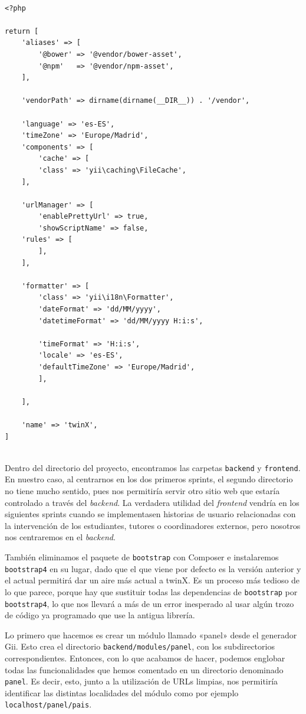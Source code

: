 \begin{verbatim}
	
<?php

return [
	'aliases' => [
		'@bower' => '@vendor/bower-asset',
		'@npm'   => '@vendor/npm-asset',
	],
	
	'vendorPath' => dirname(dirname(__DIR__)) . '/vendor',
	
	'language' => 'es-ES',
	'timeZone' => 'Europe/Madrid',
	'components' => [
		'cache' => [
		'class' => 'yii\caching\FileCache',
	],
	
	'urlManager' => [
		'enablePrettyUrl' => true,
		'showScriptName' => false,
	'rules' => [
		],
	],
	
	'formatter' => [
		'class' => 'yii\i18n\Formatter',
		'dateFormat' => 'dd/MM/yyyy',
		'datetimeFormat' => 'dd/MM/yyyy H:i:s',
		
		'timeFormat' => 'H:i:s',
		'locale' => 'es-ES',
		'defaultTimeZone' => 'Europe/Madrid',
		],
	
	],
	
	'name' => 'twinX',
]
	
\end{verbatim}

Dentro del directorio del proyecto, encontramos las carpetas \texttt{backend} y \texttt{frontend}. En nuestro caso, al centrarnos en los dos primeros sprints, el segundo directorio no tiene mucho sentido, pues nos permitiría servir otro sitio web que estaría controlado a través del \textit{backend}. La verdadera utilidad del \textit{frontend} vendría en los siguientes sprints cuando se implementasen historias de usuario relacionadas con la intervención de los estudiantes, tutores o coordinadores externos, pero nosotros nos centraremos en el \textit{backend}.

También eliminamos el paquete de \texttt{bootstrap} con Composer e instalaremos \texttt{bootstrap4} en su lugar, dado que el que viene por defecto es la versión anterior y el actual permitirá dar un aire más actual a twinX. Es un proceso más tedioso de lo que parece, porque hay que sustituir todas las dependencias de \texttt{bootstrap} por \texttt{bootstrap4}, lo que nos llevará a más de un error inesperado al usar algún trozo de código ya programado que use la antigua librería.

Lo primero que hacemos es crear un módulo llamado «panel» desde el generador Gii. Esto crea el directorio \texttt{backend/modules/panel}, con los subdirectorios correspondientes. Entonces, con lo que acabamos de hacer, podemos englobar todas las funcionalidades que hemos comentado en un directorio denominado \texttt{panel}. Es decir, esto, junto a la utilización de URLs limpias, nos permitiría identificar las distintas localidades del módulo como por ejemplo \texttt{localhost/panel/pais}.

